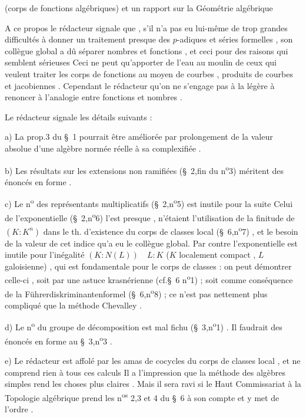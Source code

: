 (corps de fonctions algébriques) et un rapport sur la Géométrie algébrique

A ce propos le rédacteur signale que , s'il n'a pas eu lui-même de trop grandes difficultés à donner un traitement presque \textquotedbl{}\textquotedbl{} des $p$-adiques et séries formelles , son collègue global a dû séparer nombres et fonctions , et ceci pour des raisons qui semblent  sérieuses Ceci ne peut qu'apporter de l'eau au moulin de ceux qui veulent traiter les corps de fonctions au moyen de courbes , produits de courbes et jacobiennes . Cependant le rédacteur  qu'on ne s'engage pas à la légère à renoncer à l'analogie entre fonctions et nombres .

Le rédacteur signale les détails suivants :

a) La prop.3 du \S~1 pourrait être améliorée par prolongement de la valeur absolue d'une algèbre normée réelle à sa complexifiée .

b) Les résultats sur les extensions non ramifiées (\S~2,fin du n\textsuperscript{o}3) méritent des énoncés en forme .

c) Le n\textsuperscript{o} des représentants multiplicatifs (\S~2,n\textsuperscript{o}5) est inutile pour la suite Celui de l'exponentielle  (\S~2,n\textsuperscript{o}6) l'est presque , n'étaient l'utilisation de la finitude de $(K:K^{n})$ dans le th. d'existence du corps de classes local (\S~6,n\textsuperscript{o}7) , et le besoin de la valeur de cet indice qu'a eu le collègue global. Par contre l'exponentielle est inutile pour l'inégalité $(K:N(L))\quad L:K$ ($K$ localement compact , $L$ galoisienne) , qui est fondamentale pour le corps de classes : on peut démontrer celle-ci , soit par une astuce krasnérienne (cf.\S~6 n\textsuperscript{o}1) ; soit comme conséquence de la Führerdiskriminantenformel (\S~6,n\textsuperscript{o}8) ; ce n'est pas nettement plus compliqué que la méthode Chevalley .

d) Le n\textsuperscript{o} du groupe de décomposition est mal fichu (\S~3,n\textsuperscript{o}1) . Il faudrait des énoncés en forme au \S~3,n\textsuperscript{o}3 .

e) Le rédacteur est affolé par les amas de cocycles  du corps de classes local , et ne comprend rien à tous ces calculs \quad Il a l'impression que la méthode des algèbres simples rend les choses plus claires . Mais il sera ravi si le Haut Commissariat à la Topologie algébrique prend les  n\textsuperscript{os} 2,3 et 4 du \S~6 à son compte et y met de l'ordre .


